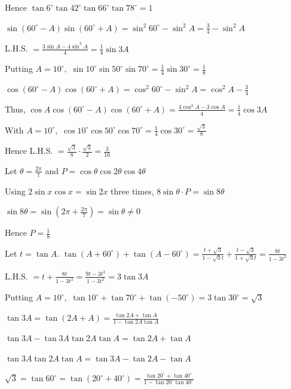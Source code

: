   Hence $\tan 6^\circ\tan 42^\circ\tan 66^\circ\tan 78^\circ = 1$

\item $\sin(60^\circ - A)\sin(60^\circ + A) = \sin^2 60^\circ - \sin^2 A = \frac{3}{4} - \sin^2 A$

  L.H.S. $= \frac{3\sin A - 4\sin^3 A}{4} = \frac{1}{4}\sin 3A$

  Putting $A = 10^\circ,$ $\sin 10^\circ\sin 50^\circ\sin 70^\circ = \frac{1}{4}\sin 30^\circ = \frac{1}{8}$

\item $\cos(60^\circ - A)\cos(60^\circ + A) = \cos^2 60^\circ - \sin^2 A = \cos^2 A - \frac{3}{4}$

  Thus, $\cos A\cos(60^\circ - A)\cos(60^\circ + A) = \frac{4\cos^3 A - 3\cos A}{4} = \frac{1}{4}\cos 3A$

  With $A = 10^\circ,$ $\cos 10^\circ\cos 50^\circ\cos 70^\circ = \frac{1}{4}\cos 30^\circ = \frac{\sqrt{3}}{8}$

  Hence L.H.S. $= \frac{\sqrt{3}}{8}\cdot\frac{\sqrt{3}}{2} = \frac{3}{16}$

\item Let $\theta = \frac{2\pi}{7}$ and $P = \cos\theta\cos 2\theta\cos 4\theta$

  Using $2\sin x\cos x = \sin 2x$ three times, $8\sin\theta\cdot P = \sin 8\theta$

  $\sin 8\theta = \sin\left(2\pi + \frac{2\pi}{7}\right) = \sin\theta \neq 0$

  Hence $P = \frac{1}{8}$

\item Let $t = \tan A.$ $\tan(A + 60^\circ) + \tan(A - 60^\circ) = \frac{t + \sqrt{3}}{1 - \sqrt{3}t} + \frac{t -
  \sqrt{3}}{1 + \sqrt{3}t} = \frac{8t}{1 - 3t^2}$

  L.H.S. $= t + \frac{8t}{1 - 3t^2} = \frac{9t - 3t^3}{1 - 3t^2} = 3\tan 3A$

  Putting $A = 10^\circ,$ $\tan 10^\circ + \tan 70^\circ + \tan(-50^\circ) = 3\tan 30^\circ = \sqrt{3}$

\item $\tan 3A = \tan(2A + A) = \frac{\tan 2A + \tan A}{1 - \tan 2A\tan A}$

  $\tan 3A - \tan 3A\tan 2A\tan A = \tan 2A + \tan A$

  $\tan 3A\tan 2A\tan A = \tan 3A - \tan 2A - \tan A$

\item $\sqrt{3} = \tan 60^\circ = \tan(20^\circ + 40^\circ) = \frac{\tan 20^\circ + \tan 40^\circ}{1 - \tan 20^\circ\tan
  40^\circ}$

